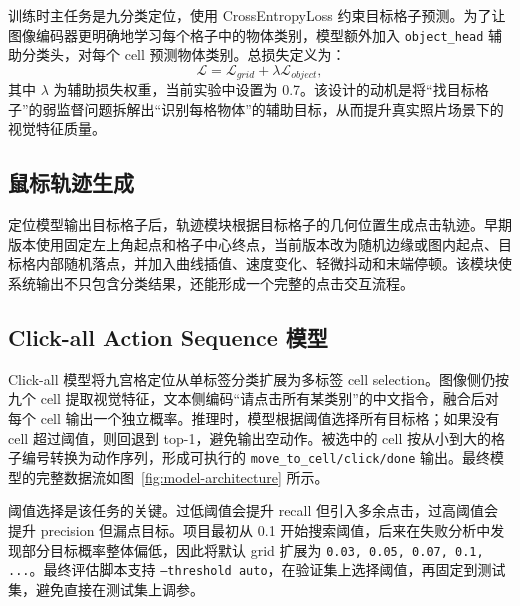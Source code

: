 \documentclass[UTF8,a4paper,12pt,fontset=fandol]{ctexart}
\newcommand{\code}[1]{\texttt{#1}}
\begin{document}
训练时主任务是九分类定位，使用 CrossEntropyLoss 约束目标格子预测。为了让图像编码器更明确地学习每个格子中的物体类别，模型额外加入 \code{object\_head} 辅助分类头，对每个 cell 预测物体类别。总损失定义为：
\[
  \mathcal{L} = \mathcal{L}_{grid} + \lambda \mathcal{L}_{object},
\]
其中 $\lambda$ 为辅助损失权重，当前实验中设置为 0.7。该设计的动机是将“找目标格子”的弱监督问题拆解出“识别每格物体”的辅助目标，从而提升真实照片场景下的视觉特征质量。

\subsection{鼠标轨迹生成}

定位模型输出目标格子后，轨迹模块根据目标格子的几何位置生成点击轨迹。早期版本使用固定左上角起点和格子中心终点，当前版本改为随机边缘或图内起点、目标格内部随机落点，并加入曲线插值、速度变化、轻微抖动和末端停顿。该模块使系统输出不只包含分类结果，还能形成一个完整的点击交互流程。

\subsection{Click-all Action Sequence 模型}

Click-all 模型将九宫格定位从单标签分类扩展为多标签 cell selection。图像侧仍按九个 cell 提取视觉特征，文本侧编码“请点击所有某类别”的中文指令，融合后对每个 cell 输出一个独立概率。推理时，模型根据阈值选择所有目标格；如果没有 cell 超过阈值，则回退到 top-1，避免输出空动作。被选中的 cell 按从小到大的格子编号转换为动作序列，形成可执行的 \code{move\_to\_cell/click/done} 输出。最终模型的完整数据流如图~\ref{fig:model-architecture} 所示。

阈值选择是该任务的关键。过低阈值会提升 recall 但引入多余点击，过高阈值会提升 precision 但漏点目标。项目最初从 0.1 开始搜索阈值，后来在失败分析中发现部分目标概率整体偏低，因此将默认 grid 扩展为 \code{0.03, 0.05, 0.07, 0.1, ...}。最终评估脚本支持 \code{--threshold auto}，在验证集上选择阈值，再固定到测试集，避免直接在测试集上调参。
\end{document}
